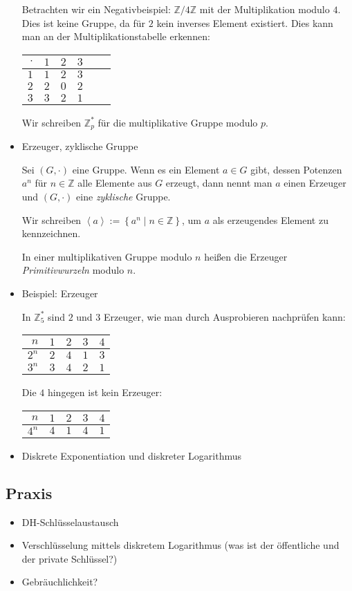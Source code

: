 \documentclass[
  a4paper,
  11pt,
]{article}
\newcommand{\Z}{\mathbb{Z}}
\begin{document}
\begin{itemize}
    Betrachten wir ein Negativbeispiel: $\Z/4\Z$ mit der Multiplikation modulo
    $4$. Dies ist keine Gruppe, da für $2$ kein inverses Element existiert. Dies
    kann man an der Multiplikationstabelle erkennen:
    \begin{center}
      \begin{tabular}{r|ccccc}
        $\cdot$ & $1$ & $2$ & $3$\\\hline
        $1$     & $1$ & $2$ & $3$\\
        $2$     & $2$ & $0$ & $2$\\
        $3$     & $3$ & $2$ & $1$
      \end{tabular}
    \end{center}

    Wir schreiben $\Z_p^*$ für die multiplikative Gruppe modulo $p$.

  \item Erzeuger, zyklische Gruppe

    Sei $(G, \cdot)$ eine Gruppe. Wenn es ein Element $a \in G$ gibt, dessen
    Potenzen $a^n$ für $n \in \Z$ alle Elemente aus $G$ erzeugt, dann nennt man
    $a$ einen Erzeuger und $(G, \cdot)$ eine \emph{zyklische} Gruppe.

    Wir schreiben $\left\langle a \right\rangle := \left\{ a^n \mid n \in \Z
    \right\}$, um $a$ als erzeugendes Element zu kennzeichnen.

    In einer multiplikativen Gruppe modulo $n$ heißen die Erzeuger
    \emph{Primitivwurzeln} modulo $n$.

  \item Beispiel: Erzeuger

    In $\Z_5^*$ sind $2$ und $3$ Erzeuger, wie man durch Ausprobieren nachprüfen
    kann:
    \begin{center}
      \begin{tabular}{r|rrrr}
        $n$   & $1$ & $2$ & $3$ & $4$\\\hline
        $2^n$ & $2$ & $4$ & $1$ & $3$\\
        $3^n$ & $3$ & $4$ & $2$ & $1$
      \end{tabular}
    \end{center}
    Die $4$ hingegen ist kein Erzeuger:
    \begin{center}
      \begin{tabular}{r|rrrr}
        $n$   & $1$ & $2$ & $3$ & $4$\\\hline
        $4^n$ & $4$ & $1$ & $4$ & $1$
      \end{tabular}
    \end{center}

  \item Diskrete Exponentiation und diskreter Logarithmus

\end{itemize}

\subsection*{Praxis}
\label{sub:Praxis}

\begin{itemize}
  \item DH-Schlüsselaustausch
  \item Verschlüsselung mittels diskretem Logarithmus (was ist der öffentliche
    und der private Schlüssel?)
  \item Gebräuchlichkeit?
\end{itemize}
\end{document}
